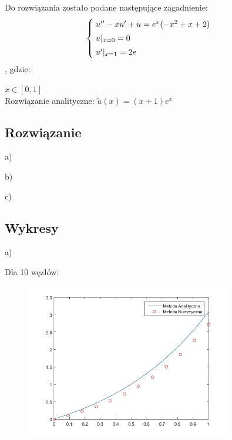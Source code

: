 Do rozwiązania zostało podane następujące zagadnienie:
\[
\begin{cases}
\vspace{0.1cm} 
\hspace{0,1cm}u''-xu' + u=e^x(-x^2+x+2) \\
\vspace{0.1cm}
\hspace{0,1cm}u|_{x=0}=0 \\
\hspace{0,1cm}u'|_{x=1}=2e
\end{cases}
\]
, gdzie:

$x\in [0,1]$
\\
Rozwiązanie analityczne: $\widetilde{u}(x) = (x+1)e^x$

\subsection{Rozwiązanie}


\begin{samepage}
a)

\end{samepage}
\newpage
\begin{samepage}
b)

\end{samepage}
\newpage
\begin{samepage}
c)

\end{samepage}

\newpage

\subsection{Wykresy}

a)\\
\begin{samepage}
	Dla 10 węzłów:
	
	
	
	\FloatBarrier
	\begin{figure}[!ht]
		\begin{center}
			\includegraphics[width=0.8\textwidth]{Lab4/charts/zad4/1/10.png}
		\end{center}
	\end{figure}
	\FloatBarrier
\end{samepage}

